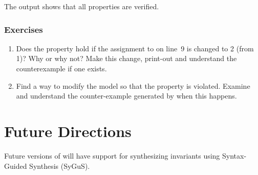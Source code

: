 The output shows that all properties are verified.

\subsubsection{Exercises}
\begin{enumerate}
    \item Does the property  hold if the assignment to  on line~9 is changed to 2 (from 1)? Why or why not? Make this change, print-out and understand the counterexample if one exists.

    \item Find a way to modify the model so that the property  is violated. Examine and understand the counter-example generated by \uclid{} when this happens.
\end{enumerate}
\section{Future Directions}

Future versions of \uclid{} will have support for synthesizing invariants using Syntax-Guided Synthesis (SyGuS).

